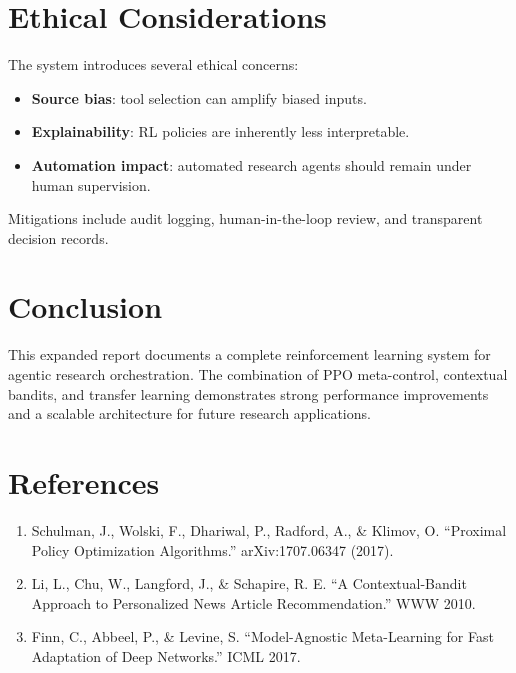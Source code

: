 \documentclass[11pt,a4paper]{article}
\begin{document}
\section{Ethical Considerations}
The system introduces several ethical concerns:
\begin{itemize}[leftmargin=*]
  \item \textbf{Source bias}: tool selection can amplify biased inputs.
  \item \textbf{Explainability}: RL policies are inherently less interpretable.
  \item \textbf{Automation impact}: automated research agents should remain under human supervision.
\end{itemize}
Mitigations include audit logging, human-in-the-loop review, and transparent decision records.

\section{Conclusion}
This expanded report documents a complete reinforcement learning system for agentic research orchestration. The combination of PPO meta-control, contextual bandits, and transfer learning demonstrates strong performance improvements and a scalable architecture for future research applications.

\section*{References}
\begin{enumerate}[leftmargin=*]
  \item Schulman, J., Wolski, F., Dhariwal, P., Radford, A., \& Klimov, O. ``Proximal Policy Optimization Algorithms.'' arXiv:1707.06347 (2017).
  \item Li, L., Chu, W., Langford, J., \& Schapire, R. E. ``A Contextual-Bandit Approach to Personalized News Article Recommendation.'' WWW 2010.
  \item Finn, C., Abbeel, P., \& Levine, S. ``Model-Agnostic Meta-Learning for Fast Adaptation of Deep Networks.'' ICML 2017.
\end{enumerate}
\end{document}
